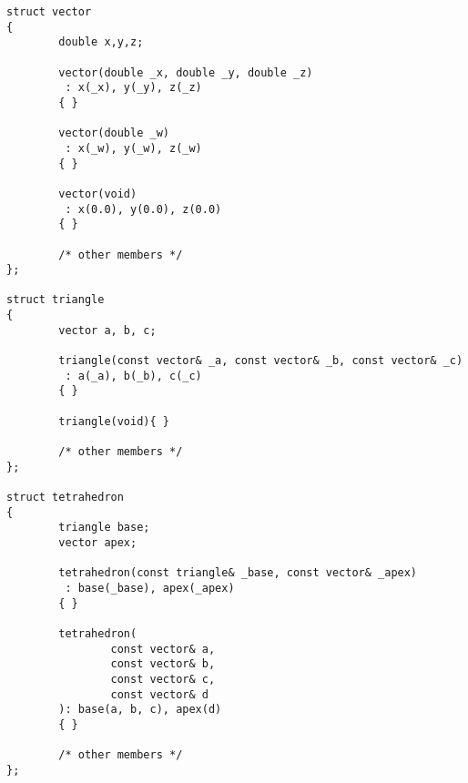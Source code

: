 \begin{lstlisting}
struct vector
{
        double x,y,z;

        vector(double _x, double _y, double _z)
         : x(_x), y(_y), z(_z)
        { }

        vector(double _w)
         : x(_w), y(_w), z(_w)
        { }

        vector(void)
         : x(0.0), y(0.0), z(0.0)
        { }

        /* other members */
};

struct triangle
{
        vector a, b, c;

        triangle(const vector& _a, const vector& _b, const vector& _c)
         : a(_a), b(_b), c(_c)
        { }

        triangle(void){ }

        /* other members */
};

struct tetrahedron
{
        triangle base;
        vector apex;

        tetrahedron(const triangle& _base, const vector& _apex)
         : base(_base), apex(_apex)
        { }

        tetrahedron(
                const vector& a,
                const vector& b,
                const vector& c,
                const vector& d
        ): base(a, b, c), apex(d)
        { }

        /* other members */
};

\end{lstlisting}

